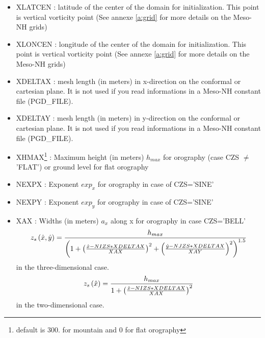 \begin{itemize}          
\item XLATCEN  : latitude  of the center of the domain for initialization. This  point is vertical vorticity point (See annexe \ref{a:grid} for more details on the Meso-NH grids)

\item XLONCEN  :  longitude of the center of the domain for initialization. This  point is vertical vorticity point (See annexe \ref{a:grid} for more details on the Meso-NH grids)

\item XDELTAX  : mesh length (in meters)
 in x-direction on the conformal or cartesian plane. It is  not
used if you read informations in a Meso-NH constant file (PGD\_FILE). 

\item XDELTAY  : mesh length (in meters)
 in y-direction on the conformal or cartesian plane. It is  not
used if you read informations in a Meso-NH constant file (PGD\_FILE).

\item  XHMAX\footnote{default is 300. for mountain and 0 for flat orography}  
: Maximum height (in meters)
 $h_{max}$ for orography (case CZS $\neq$ 'FLAT') or ground level for
flat orography

\item   NEXPX  : Exponent $exp_{x}$ for 
 orography in case of CZS='SINE'

\item   NEXPY   : Exponent $exp_{y}$ 
for  orography in case of CZS='SINE'

\item   XAX  :  Widths (in meters)
 $a_{x}$ along x 
 for orography in case CZS='BELL'
$$ z_s \left( \hat{x} , \hat{y} \right) = { h_{max} \over  \left(
  1 +
 \left(  { \hat{x} - NIZS * XDELTAX \over XAX } \right) ^2 + 
 \left(  { \hat{y} - NJZS * XDELTAX \over XAY } \right) ^2 
                                                      \right) ^{1.5 } } $$ 
in the three-dimensional case.
$$ z_s \left( \hat{x}  \right) = {  h_{max} \over  
1 + \left(  { \hat{x} - NIZS * XDELTAX \over XAX } \right) ^2 } $$
in the two-dimensional case.


\end{itemize}
